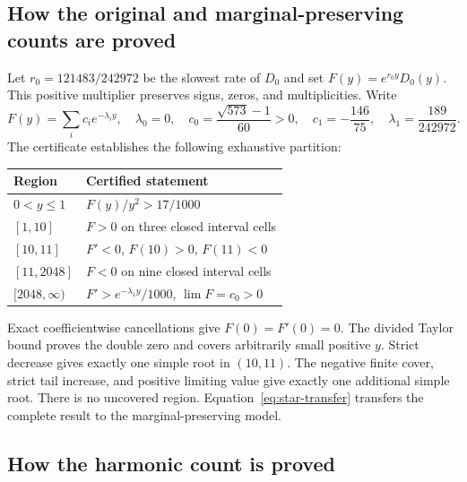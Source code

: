 \documentclass[11pt]{article}
\begin{document}
\subsection{How the original and marginal-preserving counts are proved}

Let $r_0=121483/242972$ be the slowest rate of $D_0$ and set
$F(y)=e^{r_0y}D_0(y)$. This positive multiplier preserves signs, zeros,
and multiplicities. Write
\[
 F(y)=\sum_i c_i e^{-\lambda_i y},\quad
 \lambda_0=0,\quad c_0=\frac{\sqrt{573}-1}{60}>0,
 \quad c_1=-\frac{146}{75},\quad\lambda_1=\frac{189}{242972}.
\]
The certificate establishes the following exhaustive partition:
\begin{center}
\begin{tabular}{ll}
\toprule
Region & Certified statement\\
\midrule
$0<y\le1$ & $F(y)/y^2>17/1000$\\
$[1,10]$ & $F>0$ on three closed interval cells\\
$[10,11]$ & $F'<0$, $F(10)>0$, $F(11)<0$\\
$[11,2048]$ & $F<0$ on nine closed interval cells\\
$[2048,\infty)$ & $F'>e^{-\lambda_1y}/1000$, $\lim F=c_0>0$\\
\bottomrule
\end{tabular}
\end{center}
Exact coefficientwise cancellations give $F(0)=F'(0)=0$. The divided
Taylor bound proves the double zero and covers arbitrarily small positive
$y$. Strict decrease gives exactly one simple root in $(10,11)$.
The negative finite cover, strict tail increase, and positive limiting
value give exactly one additional simple root. There is no uncovered region.
Equation~\eqref{eq:star-transfer} transfers the complete result to the
marginal-preserving model.

\subsection{How the harmonic count is proved}
\end{document}
